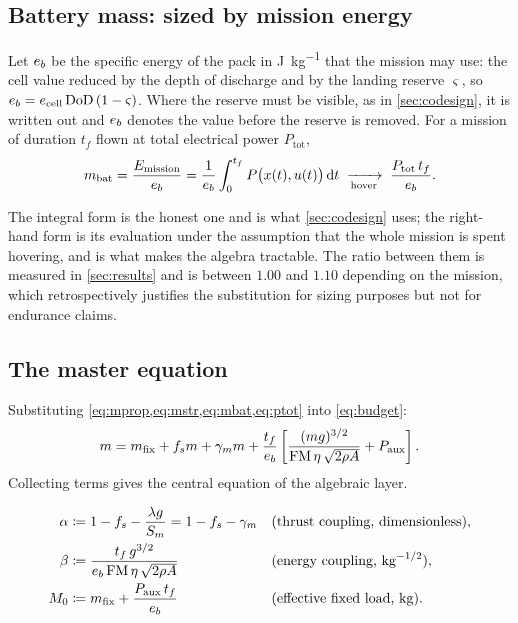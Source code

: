 \subsection{Battery mass: sized by mission energy}

\begin{model}[Battery]
\label{mod:battery}
Let $\eb$ be the specific energy of the pack in \si{\joule\per\kilo\gram} that
the mission may use: the cell value reduced by the depth of discharge and by the
landing reserve $\varsigma$, so $\eb = e_{\mathrm{cell}}\,\mathrm{DoD}\,(1-\varsigma)$.
Where the reserve must be visible, as in \cref{sec:codesign}, it is written out
and $\eb$ denotes the value before the reserve is removed. For a mission of
duration $t_f$ flown at total electrical power $P_{\mathrm{tot}}$,
\begin{equation}
  \mbat = \frac{E_{\mathrm{mission}}}{\eb}
        = \frac{1}{\eb}\int_0^{t_f} P\big(x(t),u(t)\big)\dd t
  \;\xrightarrow[\text{hover}]{}\;
  \frac{P_{\mathrm{tot}}\,t_f}{\eb} .
  \label{eq:mbat}
\end{equation}
\end{model}

The integral form is the honest one and is what \cref{sec:codesign} uses; the
right-hand form is its evaluation under the assumption that the whole mission is
spent hovering, and is what makes the algebra tractable. The ratio between them
is measured in \cref{sec:results} and is between $1.00$ and $1.10$ depending on
the mission, which retrospectively justifies the substitution for sizing
purposes but not for endurance claims.

\subsection{The master equation}

Substituting \cref{eq:mprop,eq:mstr,eq:mbat,eq:ptot} into \cref{eq:budget}:
\begin{equation}
  m = \mfix + f_s m + \gamma_m m
      + \frac{t_f}{\eb}\left[
        \frac{(mg)^{3/2}}{\FM\,\eta\,\sqrt{2\rho A}} + \Paux \right] .
  \label{eq:closure-raw}
\end{equation}
Collecting terms gives the central equation of the algebraic layer.

\begin{definition}
\label{def:coeffs}
\begin{align}
  \alpha &\coloneqq 1 - f_s - \frac{\lambda g}{S_m}
          = 1 - f_s - \gamma_m
          &&\text{(thrust coupling, dimensionless)}, \label{eq:alpha}\\
  \beta  &\coloneqq \frac{t_f\, g^{3/2}}{\eb\,\FM\,\eta\,\sqrt{2\rho A}}
          &&\text{(energy coupling, \si{\kilo\gram^{-1/2}})}, \label{eq:beta}\\
  \Mzero &\coloneqq \mfix + \frac{\Paux\, t_f}{\eb}
          &&\text{(effective fixed load, \si{\kilo\gram})} . \label{eq:M0}
\end{align}
\end{definition}

